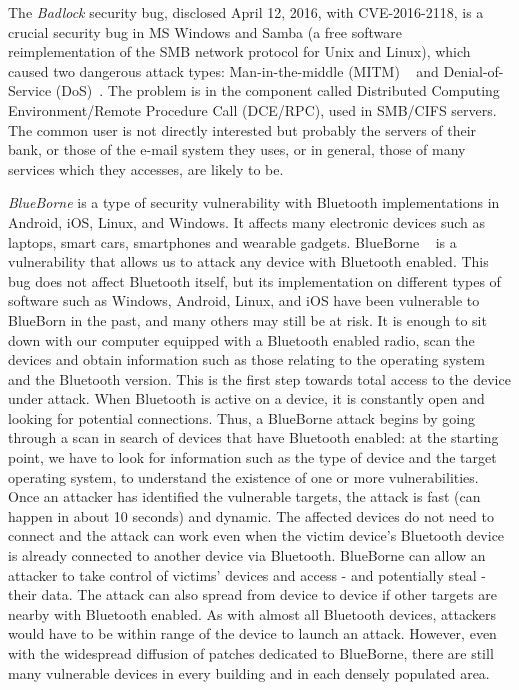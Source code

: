 \documentclass{masterthesis}
\begin{document}
The \emph{Badlock} security bug, disclosed April 12, 2016, with CVE-2016-2118, is a crucial security bug in MS Windows and Samba (a free software reimplementation of the SMB network protocol for Unix and Linux), which caused two dangerous attack types: Man-in-the-middle (MITM) ~\cite{conti2016survey} and Denial-of-Service (DoS)~\cite{lau2000distributed}.
The problem is in the component called Distributed Computing Environment/Remote Procedure Call (DCE/RPC), used in SMB/CIFS servers.
The common user is not directly interested but probably the servers of their bank, or those of the e-mail system they uses, or in general, those of many services which they accesses, are likely to be.

\emph{BlueBorne} is a type of security vulnerability with Bluetooth implementations in Android, iOS, Linux, and Windows. It affects many electronic devices such as laptops, smart cars, smartphones and wearable gadgets.
BlueBorne ~\cite{bour2018bluetooth} is a vulnerability that allows us to attack any device with Bluetooth enabled. This bug does not affect Bluetooth itself, but its implementation on different types of software such as Windows, Android, Linux, and iOS have been vulnerable to BlueBorn in the past, and many others may still be at risk.
It is enough to sit down with our computer equipped with a Bluetooth enabled radio, scan the devices and obtain information such as those relating to the operating system and the Bluetooth version. This is the first step towards total access to the device under attack.
When Bluetooth is active on a device, it is constantly open and looking for potential connections. Thus, a BlueBorne attack begins by going through a scan in search of devices that have Bluetooth enabled: at the starting point, we have to look for information such as the type of device and the target operating system, to understand the existence of one or more vulnerabilities. Once an attacker has identified the vulnerable targets, the attack is fast (can happen in about 10 seconds) and dynamic. The affected devices do not need to connect and the attack can work even when the victim device's Bluetooth device is already connected to another device via Bluetooth.
BlueBorne can allow an attacker to take control of victims' devices and access - and potentially steal - their data. The attack can also spread from device to device if other targets are nearby with Bluetooth enabled. As with almost all Bluetooth devices, attackers would have to be within range of the device to launch an attack. However, even with the widespread diffusion of patches dedicated to BlueBorne, there are still many vulnerable devices in every building and in each densely populated area.
\end{document}
